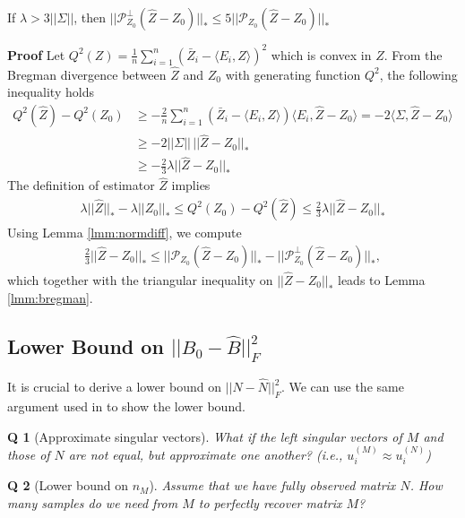 \documentclass{article} %
\newtheorem{question}{Q}
\newcommand\mc{\mathcal} %
\begin{document}
\begin{lemma}\label{lmm:bregman} If $\lambda > 3||\Sigma||$, then
$||\mc{P}_{Z_0}^\perp(\hat{Z}-Z_0)||_* \leq 5 ||\mc{P}_{Z_0}(\hat{Z}-Z_0)||_*$
\end{lemma}
\textbf{Proof} Let $Q^2(Z) = \frac{1}{n}\sum_{i=1}^{n}(\bar{Z}_i - \langle E_i, Z \rangle)^2$ which is convex in $Z$. From the Bregman divergence between $\hat{Z}$ and $Z_0$ with generating function $Q^2$, the following inequality holds
\begin{align}
Q^2(\hat{Z}) - Q^2(Z_0) &\geq - \frac{2}{n}\sum_{i=1}^n(\bar{Z}_i - \langle E_i, Z \rangle)\langle E_i, \hat{Z} - Z_0 \rangle = -2 \langle \Sigma, \hat{Z} - Z_0 \rangle \\
&\geq -2 ||\Sigma||\,||\hat{Z} - Z_0||_* \\
&\geq - \frac{2}{3} \lambda ||\hat{Z} - Z_0||_*
\end{align}
The definition of estimator $\hat{Z}$ implies
\begin{align}
\lambda||\hat{Z}||_* - \lambda||Z_0||_* \leq Q^2(Z_0) - Q^2(\hat{Z}) \leq \frac{2}{3} \lambda ||\hat{Z} - Z_0||_*
\end{align}
Using Lemma \ref{lmm:normdiff}, we compute
\begin{align}
\frac{2}{3}||\hat{Z} - Z_0||_* \leq ||\mc{P}_{Z_0}(\hat{Z} - Z_0)||_* - ||\mc{P}_{Z_0}^\perp(\hat{Z} - Z_0)||_*,
\end{align}
which together with the triangular inequality on $||\hat{Z} - Z_0||_*$ leads to Lemma \ref{lmm:bregman}.

\subsection{Lower Bound on $||B_0-\hat{B}||_F^2$}

It is crucial to derive a lower bound on $||N-\hat{N}||_F^2$. We can use the same argument used in \cite{lafond2015low} to show the lower bound.


\begin{question}[Approximate singular vectors]
What if the left singular vectors of $M$ and those of $N$ are not equal, but approximate one another? (i.e., $u_i^{(M)} \approx u_i^{(N)}$)
\end{question}

\begin{question}[Lower bound on $n_M$]
Assume that we have fully observed matrix $N$. How many samples do we need from $M$ to perfectly recover matrix $M$?
\end{question}
\end{document}
